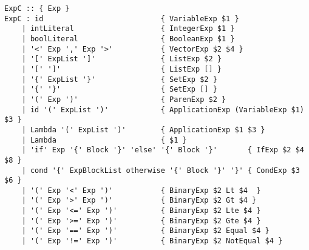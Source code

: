 \begin{lstlisting}[language=happy, float=htb,
caption={Happy grammar specification for non-terminal \lstinline{ExpC}},
label=lst:parser-expc-example]
ExpC :: { Exp }
ExpC : id                           { VariableExp $1 }
    | intLiteral                    { IntegerExp $1 }
    | boolLiteral                   { BooleanExp $1 }
    | '<' Exp ',' Exp '>'           { VectorExp $2 $4 }
    | '[' ExpList ']'               { ListExp $2 }
    | '[' ']'                       { ListExp [] }
    | '{' ExpList '}'               { SetExp $2 }
    | '{' '}'                       { SetExp [] }
    | '(' Exp ')'                   { ParenExp $2 }
    | id '(' ExpList ')'            { ApplicationExp (VariableExp $1) $3 }
    | Lambda '(' ExpList ')'        { ApplicationExp $1 $3 }
    | Lambda                        { $1 }
    | 'if' Exp '{' Block '}' 'else' '{' Block '}'       { IfExp $2 $4 $8 }
    | cond '{' ExpBlockList otherwise '{' Block '}' '}' { CondExp $3 $6 }
    | '(' Exp '<' Exp ')'           { BinaryExp $2 Lt $4  }
    | '(' Exp '>' Exp ')'           { BinaryExp $2 Gt $4 }
    | '(' Exp '<=' Exp ')'          { BinaryExp $2 Lte $4 }
    | '(' Exp '>=' Exp ')'          { BinaryExp $2 Gte $4 }
    | '(' Exp '==' Exp ')'          { BinaryExp $2 Equal $4 }
    | '(' Exp '!=' Exp ')'          { BinaryExp $2 NotEqual $4 }
\end{lstlisting}

